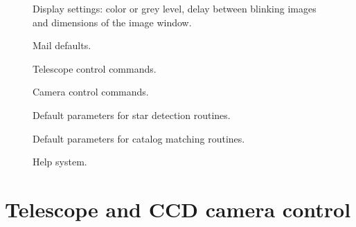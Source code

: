 \documentclass[11pt]{article}
\begin{document}
\begin{figure}
\begin{center}
\epsfxsize=8cm
\caption{Display settings: color or grey level, delay between blinking
images and dimensions of the image window.}
\label{display}
\end{center}
\end{figure}

\begin{figure}
\begin{center}
\epsfxsize=8cm
\caption{Mail defaults.}
\label{mail}
\end{center}
\end{figure}


\begin{figure}
\begin{center}
\epsfxsize=8cm
\caption{Telescope control commands.}
\label{telescope}
\end{center}
\end{figure}

\begin{figure}
\begin{center}
\epsfxsize=8cm
\caption{Camera control commands.}
\label{camera}
\end{center}
\end{figure}

\begin{figure}
\begin{center}
\epsfxsize=8cm
\caption{Default parameters for star detection routines.}
\label{countdefs}
\end{center}
\end{figure}

\begin{figure}
\begin{center}
\epsfxsize=8cm
\caption{Default parameters for catalog matching routines.}
\label{matchdefs}
\end{center}
\end{figure}

\begin{figure}
\begin{center}
\epsfxsize=8cm
\caption{Help system.}
\label{help}
\end{center}
\end{figure}


\section{Telescope and CCD camera control}
\end{document}
